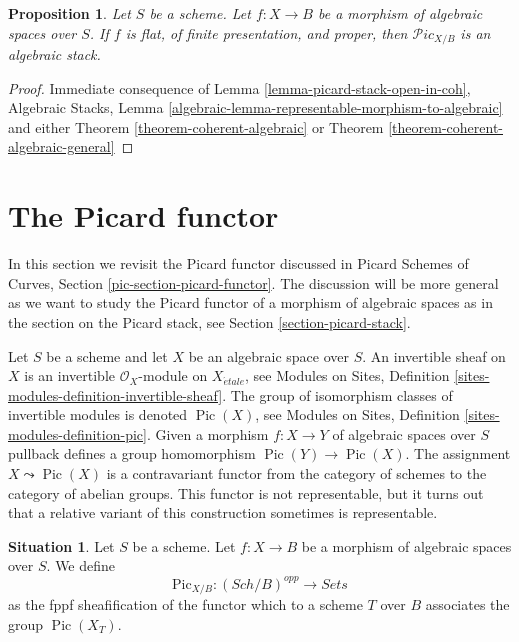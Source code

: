 \documentclass{stacks-project}
\theoremstyle{plain}
\newtheorem{proposition}[subsection]{Proposition}
\theoremstyle{definition}
\newtheorem{situation}[subsection]{Situation}
\theoremstyle{remark}
\numberwithin{equation}{subsection}
\def\Sch{\mathit{Sch}}
\def\etale{{\acute{e}tale}}
\def\Pic{\mathop{\mathrm{Pic}}\nolimits}
\def\Picardstack{\mathcal{P}\!\mathit{ic}}
\def\Picardfunctor{\mathrm{Pic}}
\begin{document}
\begin{proposition}
\label{proposition-pic}
Let $S$ be a scheme. Let $f : X \to B$ be a morphism of algebraic
spaces over $S$. If $f$ is flat, of finite presentation, and proper, then
$\Picardstack_{X/B}$ is an algebraic stack.
\end{proposition}

\begin{proof}
Immediate consequence of
Lemma \ref{lemma-picard-stack-open-in-coh},
Algebraic Stacks, Lemma
\ref{algebraic-lemma-representable-morphism-to-algebraic}
and either
Theorem \ref{theorem-coherent-algebraic}
or
Theorem \ref{theorem-coherent-algebraic-general}
\end{proof}








\section{The Picard functor}
\label{section-picard-functor}

\noindent
In this section we revisit the Picard functor discussed in
Picard Schemes of Curves, Section \ref{pic-section-picard-functor}.
The discussion will be more general as we want to study
the Picard functor of a morphism of algebraic spaces as in
the section on the Picard stack, see Section \ref{section-picard-stack}.

\medskip\noindent
Let $S$ be a scheme and let $X$ be an algebraic space over $S$.
An invertible sheaf on $X$ is an invertible $\mathcal{O}_X$-module
on $X_\etale$, see
Modules on Sites, Definition \ref{sites-modules-definition-invertible-sheaf}.
The group of isomorphism classes of invertible modules is denoted
$\Pic(X)$, see
Modules on Sites, Definition \ref{sites-modules-definition-pic}.
Given a morphism $f : X \to Y$ of algebraic spaces over $S$
pullback defines a group homomorphism $\Pic(Y) \to \Pic(X)$.
The assignment
$X \leadsto \Pic(X)$ is a contravariant functor from the category
of schemes to the category of abelian groups. This functor is not
representable, but it turns out that a relative variant of this
construction sometimes is representable.

\begin{situation}
\label{situation-pic}
Let $S$ be a scheme.
Let $f : X \to B$ be a morphism of algebraic spaces over $S$.
We define
$$
\Picardfunctor_{X/B} : (\Sch/B)^{opp} \longrightarrow \textit{Sets}
$$
as the fppf sheafification of the functor which to a scheme $T$
over $B$ associates the group $\Pic(X_T)$.
\end{situation}
\end{document}
